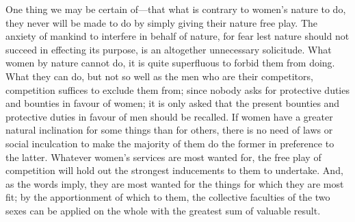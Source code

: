 \documentclass[12pt]{report}
\begin{document}
One thing we may be certain of—that what is contrary to women's nature to do, they never will be made to do by simply giving their nature free play. The anxiety of mankind to interfere in behalf of nature, for fear lest nature should not succeed in effecting its purpose, is an altogether unnecessary solicitude. What women by nature cannot do, it is quite superfluous to forbid them from doing. What they can do, but not so well as the men who are their competitors, competition suffices to exclude them from; since nobody asks for protective duties and bounties in favour of women; it is only asked that the present bounties and protective duties in favour of men should be recalled. If women have a greater natural inclination for some things than for others, there is no need of laws or social inculcation to make the majority of them do the former in preference to the latter. Whatever women's services are most wanted for, the free play of competition will hold out the strongest inducements to them to undertake. And, as the words imply, they are most wanted for the things for which they are most fit; by the apportionment of which to them, the collective faculties of the two sexes can be applied on the whole with the greatest sum of valuable result.
\end{document}
